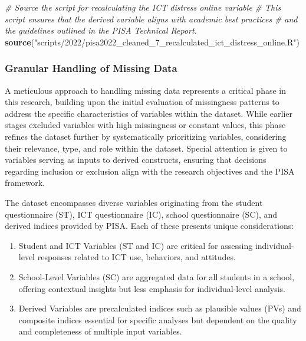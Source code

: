 \documentclass[
]{article}
\newenvironment{Shaded}{\begin{snugshade}}{\end{snugshade}}
\newcommand{\CommentTok}[1]{\textcolor[rgb]{0.56,0.35,0.01}{\textit{#1}}}
\newcommand{\FunctionTok}[1]{\textcolor[rgb]{0.13,0.29,0.53}{\textbf{#1}}}
\newcommand{\NormalTok}[1]{#1}
\newcommand{\StringTok}[1]{\textcolor[rgb]{0.31,0.60,0.02}{#1}}
\begin{document}
\begin{Shaded}
\begin{Highlighting}[]
\CommentTok{\# Source the script for recalculating the ICT distress online variable}
\CommentTok{\# This script ensures that the derived variable aligns with academic best practices }
\CommentTok{\# and the guidelines outlined in the PISA Technical Report.}
\FunctionTok{source}\NormalTok{(}\StringTok{"scripts/2022/pisa2022\_cleaned\_7\_recalculated\_ict\_distress\_online.R"}\NormalTok{)}
\end{Highlighting}
\end{Shaded}

\hypertarget{granular-handling-of-missing-data}{%
\subsubsection{Granular Handling of Missing
Data}\label{granular-handling-of-missing-data}}

A meticulous approach to handling missing data represents a critical
phase in this research, building upon the initial evaluation of
missingness patterns to address the specific characteristics of
variables within the dataset. While earlier stages excluded variables
with high missingness or constant values, this phase refines the dataset
further by systematically prioritizing variables, considering their
relevance, type, and role within the dataset. Special attention is given
to variables serving as inputs to derived constructs, ensuring that
decisions regarding inclusion or exclusion align with the research
objectives and the PISA framework.

The dataset encompasses diverse variables originating from the student
questionnaire (ST), ICT questionnaire (IC), school questionnaire (SC),
and derived indices provided by PISA. Each of these presents unique
considerations:

\begin{enumerate}
\def\labelenumi{\arabic{enumi}.}
\item
  Student and ICT Variables (ST and IC) are critical for assessing
  individual-level responses related to ICT use, behaviors, and
  attitudes.
\item
  School-Level Variables (SC) are aggregated data for all students in a
  school, offering contextual insights but less emphasis for
  individual-level analysis.
\item
  Derived Variables are precalculated indices such as plausible values
  (PVs) and composite indices essential for specific analyses but
  dependent on the quality and completeness of multiple input variables.
\end{enumerate}
\end{document}
